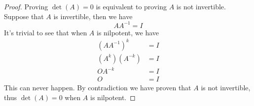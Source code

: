 \begin{homeworkProblem}

\solution

\begin{proof}
Proving $\det(A) = 0$ is equivalent to proving $A$ is not invertible. Suppose that $A$ is invertible, then we have \[
    AA^{-1} = I
\]
It's trivial to see that when $A$ is nilpotent, we have \[
\begin{aligned}
    (AA^{-1})^{k} &= I \\
    (A^{k})(A^{-k}) &= I \\
    O A^{-k} &= I \\
    O &= I
\end{aligned}
\]
This can never happen. By contradiction we have proven that $A$ is not invertible, thus $\det(A) = 0$ when $A$ is nilpotent.
\end{proof}
\end{homeworkProblem}
